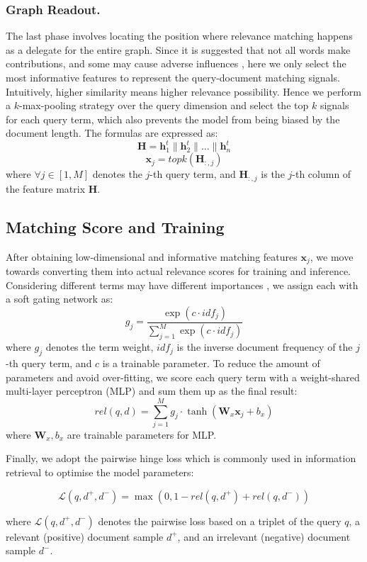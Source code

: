 \subsubsection{Graph Readout.}
The last phase involves locating the position where relevance matching happens as a delegate for the entire graph. Since it is suggested that not all words make contributions, and some may cause adverse influences \cite{guo2016deep}, here we only select the most informative features to represent the query-document matching signals. Intuitively, higher similarity means higher relevance possibility. Hence we perform a $k$-max-pooling strategy over the query dimension and select the top $k$ signals for each query term, which also prevents the model from being biased by the document length. The formulas are expressed as:
\begin{equation}\mathbf{H}=\mathbf{h}_{1}^{t} \parallel \mathbf{h}_{2}^{t} \parallel \ldots \parallel \mathbf{h}_{n}^{t}\end{equation}
\begin{equation}
\mathbf{x}_{j} = {topk}(\mathbf{H}_{:,j})
\end{equation}
where $\forall j\in [1, M]$ denotes the $j$-th query term, and $\mathbf{H}_{:,j}$ is the $j$-th column of the feature matrix $\mathbf{H}$.

\subsection{Matching Score and Training}
After obtaining low-dimensional and informative matching features $\mathbf{x}_j$, we move towards converting them into actual relevance scores for training and inference. Considering different terms may have different importances \cite{guo2016deep}, we assign each with a soft gating network as:
\begin{equation}g_{j}=\frac{\exp \left({c} \cdot idf_j \right)}{\sum_{j=1}^{M} \exp \left({c} \cdot idf_j \right)}\end{equation}
where $g_j$ denotes the term weight, $idf_j$ is the inverse document frequency of the $j$-th query term, and $c$ is a trainable parameter. To reduce the amount of parameters and avoid over-fitting, we score each query term with a weight-shared multi-layer perceptron (MLP) and sum them up as the final result:
\begin{equation}{rel}(q, d)=\sum_{j=1}^{M} g_j \cdot \tanh \left(\mathbf{W}_x \mathbf{x}_{j}+{b}_x \right)\end{equation}
where $\mathbf{W}_x, b_x$ are trainable parameters for MLP.

Finally, we adopt the pairwise hinge loss which is commonly used in information retrieval to optimise the model parameters:
\begin{small}
	\begin{equation}\mathcal{L}\left(q, d^{+}, d^{-}\right)=\max \left(0, 1-rel\left(q, d^{+}\right)+rel\left(q, d^{-}\right)\right)\end{equation} 
\end{small}
where $\mathcal{L}\left(q, d^{+}, d^{-}\right)$ denotes the pairwise loss based on a triplet of the query $q$, a relevant (positive) document sample $d^+$, and an irrelevant (negative) document sample $d^-$.

